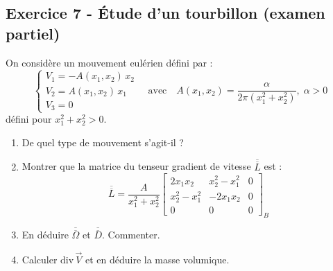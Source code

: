 \documentclass[12pt,a4paper]{article}
\begin{document}
\subsection*{Exercice 7 - Étude d'un tourbillon (examen partiel) \niveau{\difficile}}

\begin{boiteexercice}
On considère un mouvement eulérien défini par :
\[
\begin{cases}
V_1 = -A(x_1,x_2)\,x_2\\
V_2 = A(x_1,x_2)\,x_1\\
V_3 = 0
\end{cases}
\quad\text{avec}\quad A(x_1,x_2) = \frac{\alpha}{2\pi(x_1^2+x_2^2)},\; \alpha > 0
\]
défini pour $x_1^2 + x_2^2 > 0$.
\begin{enumerate}
  \item De quel type de mouvement s'agit-il ?
  \item Montrer que la matrice du tenseur gradient de vitesse $\overline{\overline{L}}$ est :
  \[
  \overline{\overline{L}} = \frac{A}{x_1^2+x_2^2}\begin{bmatrix}2x_1x_2 & x_2^2-x_1^2 & 0\\ x_2^2-x_1^2 & -2x_1x_2 & 0\\ 0 & 0 & 0\end{bmatrix}_B
  \]
  \item En déduire $\overline{\overline{\Omega}}$ et $\overline{\overline{D}}$. Commenter.
  \item Calculer $\mathrm{div}\,\vec{V}$ et en déduire la masse volumique.
\end{enumerate}
\end{boiteexercice}
\end{document}
